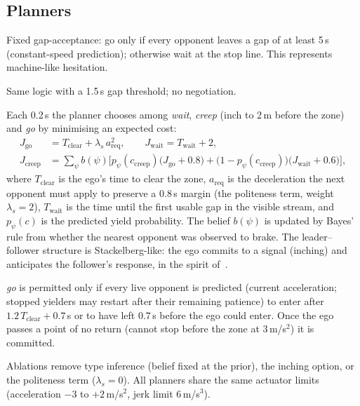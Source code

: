 \documentclass[11pt,a4paper]{article}
\begin{document}
\subsection{Planners}
\begin{description}\setlength\itemsep{0pt}
\item[Rigid-safety.] Fixed gap-acceptance: go only if every opponent leaves a gap of at least 5\,s (constant-speed prediction); otherwise wait at the stop line. This represents machine-like hesitation.
\item[Assertive.] Same logic with a 1.5\,s gap threshold; no negotiation.
\item[Social (ours).] Each 0.2\,s the planner chooses among \emph{wait}, \emph{creep} (inch to 2\,m before the zone) and \emph{go} by minimising an expected cost:
\begin{align}
J_{\text{go}} &= T_{\text{clear}} + \lambda_s\,a_{\text{req}}^2,\qquad
J_{\text{wait}} = T_{\text{wait}}+2,\\
J_{\text{creep}} &= \sum_{\psi} b(\psi)\Big[p_\psi(c_{\text{creep}})\big(J_{\text{go}}+0.8\big)+\big(1-p_\psi(c_{\text{creep}})\big)\big(J_{\text{wait}}+0.6\big)\Big],
\end{align}
where $T_{\text{clear}}$ is the ego's time to clear the zone, $a_{\text{req}}$ is the deceleration the next opponent must apply to preserve a 0.8\,s margin (the politeness term, weight $\lambda_s=2$), $T_{\text{wait}}$ is the time until the first usable gap in the visible stream, and $p_\psi(c)$ is the predicted yield probability. The belief $b(\psi)$ is updated by Bayes' rule from whether the nearest opponent was observed to brake. The leader--follower structure is Stackelberg-like: the ego commits to a signal (inching) and anticipates the follower's response, in the spirit of~\cite{sadigh,schwarting}.
\item[Safety shield.] \emph{go} is permitted only if every live opponent is predicted (current acceleration; stopped yielders may restart after their remaining patience) to enter after $1.2\,T_{\text{clear}}+0.7$\,s or to have left $0.7$\,s before the ego could enter. Once the ego passes a point of no return (cannot stop before the zone at $3$\,m/s$^2$) it is committed.
\end{description}
Ablations remove type inference (belief fixed at the prior), the inching option, or the politeness term ($\lambda_s=0$). All planners share the same actuator limits (acceleration $-3$ to $+2$\,m/s$^2$, jerk limit 6\,m/s$^3$).
\end{document}

